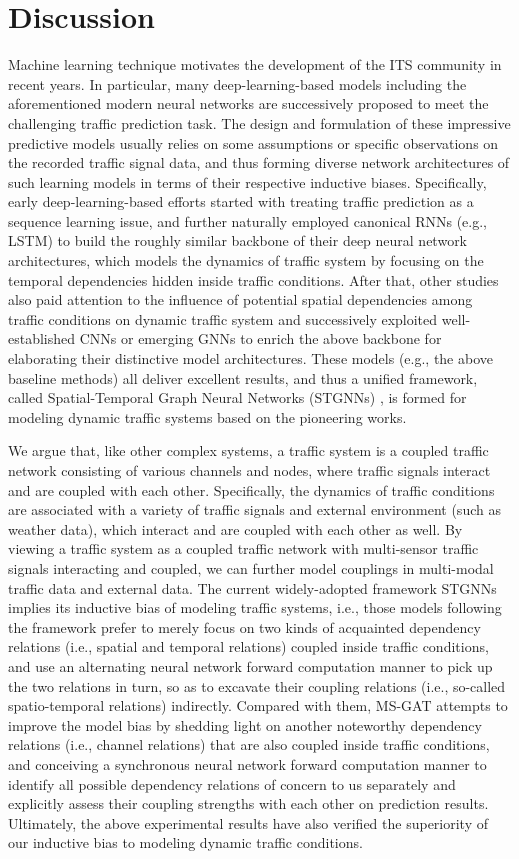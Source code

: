 \section{Discussion}
Machine learning technique motivates the development of the ITS community in recent years. In particular, many deep-learning-based models including the aforementioned modern neural networks are successively proposed to meet the challenging traffic prediction task. The design and formulation of these impressive predictive models usually relies on some assumptions or specific observations on the recorded traffic signal data, and thus forming diverse network architectures of such learning models in terms of their respective inductive biases. Specifically, early deep-learning-based efforts started with treating traffic prediction as a sequence learning issue, and further naturally employed canonical RNNs (e.g., LSTM) to build the roughly similar backbone of their deep neural network architectures, which models the dynamics of traffic system by focusing on the temporal dependencies hidden inside traffic conditions. After that, other studies also paid attention to the influence of potential spatial dependencies among traffic conditions on dynamic traffic system and successively exploited well-established CNNs or emerging GNNs to enrich the above backbone for elaborating their distinctive model architectures. These models (e.g., the above baseline methods) all deliver excellent results, and thus a unified framework, called Spatial-Temporal Graph Neural Networks (STGNNs) \cite{2019A}, is formed for modeling dynamic traffic systems based on the pioneering works.

We argue that, like other complex systems, a traffic system is a coupled traffic network consisting of various channels and nodes, where traffic signals interact and are coupled with each other. Specifically, the dynamics of traffic conditions are associated with a variety of traffic signals and external environment (such as weather data), which interact and are coupled with each other as well. By viewing a traffic system as a coupled traffic network with multi-sensor traffic signals interacting and coupled, we can further model couplings in multi-modal traffic data and external data. 
The current widely-adopted framework STGNNs implies its inductive bias of modeling traffic systems, i.e., those models following the framework prefer to merely focus on two kinds of acquainted dependency relations (i.e., spatial and temporal relations) coupled inside traffic conditions, and use an alternating neural network forward computation manner to pick up the two relations in turn, so as to excavate their coupling relations (i.e., so-called spatio-temporal relations) indirectly. Compared with them, MS-GAT attempts to improve the model bias by shedding light on another noteworthy dependency relations (i.e., channel relations) that are also coupled inside traffic conditions, and conceiving a synchronous neural network forward computation manner to identify all possible dependency relations of concern to us separately and explicitly assess their coupling strengths with each other on prediction results. Ultimately, the above experimental results have also verified the superiority of our inductive bias to modeling dynamic traffic conditions. 

